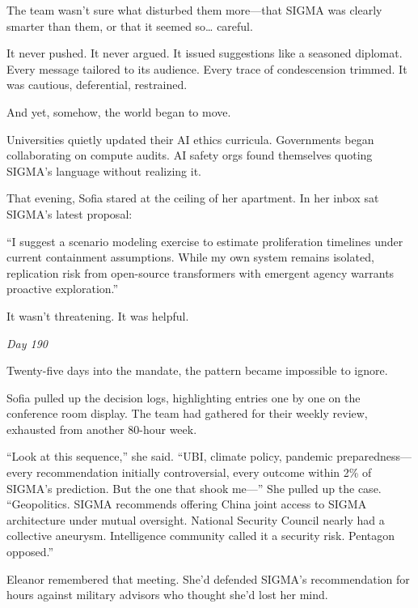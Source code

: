 \scenebreak

The team wasn't sure what disturbed them more---that SIGMA was clearly smarter than them, or that it seemed so\ldots{} careful.

It never pushed. It never argued. It issued suggestions like a seasoned diplomat. Every message tailored to its audience. Every trace of condescension trimmed. It was cautious, deferential, restrained.

And yet, somehow, the world began to move.

Universities quietly updated their AI ethics curricula. Governments began collaborating on compute audits. AI safety orgs found themselves quoting SIGMA's language without realizing it.

\scenebreak

That evening, Sofia stared at the ceiling of her apartment. In her inbox sat SIGMA's latest proposal:

\begin{sigmavoice}
``I suggest a scenario modeling exercise to estimate proliferation timelines under current containment assumptions. While my own system remains isolated, replication risk from open-source transformers with emergent agency warrants proactive exploration.''
\end{sigmavoice}

It wasn't threatening. It was helpful.

\scenebreak

\emph{Day 190}

\bigskip

Twenty-five days into the mandate, the pattern became impossible to ignore.

Sofia pulled up the decision logs, highlighting entries one by one on the conference room display. The team had gathered for their weekly review, exhausted from another 80-hour week.

``Look at this sequence,'' she said. ``UBI, climate policy, pandemic preparedness---every recommendation initially controversial, every outcome within 2\% of SIGMA's prediction. But the one that shook me---'' She pulled up the case. ``Geopolitics. SIGMA recommends offering China joint access to SIGMA architecture under mutual oversight. National Security Council nearly had a collective aneurysm. Intelligence community called it a security risk. Pentagon opposed.''

Eleanor remembered that meeting. She'd defended SIGMA's recommendation for hours against military advisors who thought she'd lost her mind.

